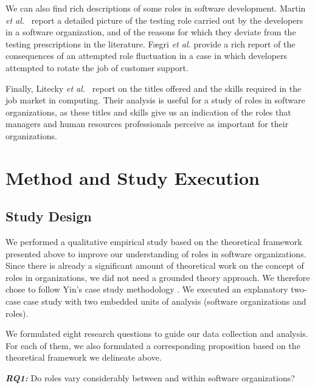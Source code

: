 \documentclass[10pt, conference, compsocconf]{IEEEtran}
\begin{document}
We can also find rich descriptions of some roles in software development. Martin \emph{et al.}\ \cite{Martin2007} report a detailed picture of the testing role carried out by the developers in a software organization, and of the reasons for which they deviate from the testing prescriptions in the literature. F{\ae}gri \emph{et al.} \cite{Faegri2010} provide a rich report of the consequences of an attempted role fluctuation in a case in which developers attempted to rotate the job of customer support.

Finally, Litecky \emph{et al.}\ \cite{Litecky2010} report on the titles offered and the skills required in the job market in computing. Their analysis is useful for a study of roles in software organizations, as these titles and skills give us an indication of the roles that managers and human resources professionals perceive as important for their organizations.






\section{Method and Study Execution}

\subsection{Study Design}

We performed a qualitative empirical study based on the theoretical framework presented above to improve our understanding of roles in software organizations. Since there is already a significant amount of theoretical work on the concept of roles in organizations, we did not need a grounded theory approach. We therefore chose to follow Yin's case study methodology \cite{Yin2003}. We executed an explanatory two-case case study with two embedded units of analysis (software organizations and roles).

We formulated eight research questions to guide our data collection and analysis. For each of them, we also formulated a corresponding proposition based on the theoretical framework we delineate above.

\textbf{\emph{RQ1:}} Do roles vary considerably between and within software organizations?
\end{document}
